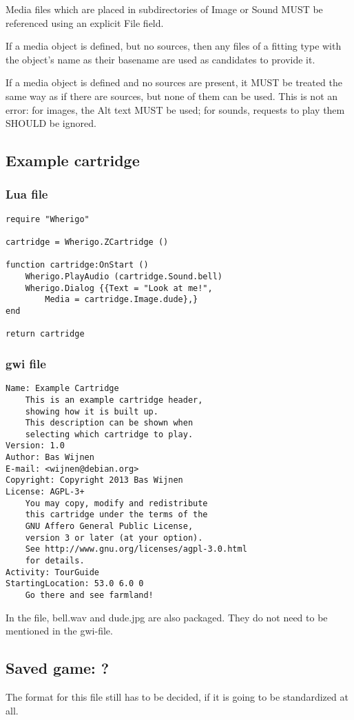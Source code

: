 \documentclass{article}
\begin{document}
Media files which are placed in subdirectories of Image or Sound MUST be
referenced using an explicit File field.

If a media object is defined, but no sources, then any files of a fitting type
with the object's name as their basename are used as candidates to provide it.

If a media object is defined and no sources are present, it MUST be treated the
same way as if there are sources, but none of them can be used. This is not an
error: for images, the Alt text MUST be used; for sounds, requests to play them
SHOULD be ignored.

\subsection{Example cartridge}
\subsubsection{Lua file}
\noindent\begin{lstlisting}
require "Wherigo"

cartridge = Wherigo.ZCartridge ()

function cartridge:OnStart ()
	Wherigo.PlayAudio (cartridge.Sound.bell)
	Wherigo.Dialog {{Text = "Look at me!",
		Media = cartridge.Image.dude},}
end

return cartridge
\end{lstlisting}
\subsubsection{gwi file}
\noindent\begin{lstlisting}
Name: Example Cartridge
	This is an example cartridge header,
	showing how it is built up.
	This description can be shown when
	selecting which cartridge to play.
Version: 1.0
Author: Bas Wijnen
E-mail: <wijnen@debian.org>
Copyright: Copyright 2013 Bas Wijnen
License: AGPL-3+
	You may copy, modify and redistribute
	this cartridge under the terms of the
	GNU Affero General Public License,
	version 3 or later (at your option).
	See http://www.gnu.org/licenses/agpl-3.0.html
	for details.
Activity: TourGuide
StartingLocation: 53.0 6.0 0
	Go there and see farmland!
\end{lstlisting}

In the file, bell.wav and dude.jpg are also packaged. They do not need to be
mentioned in the gwi-file.

\subsection{Saved game: ?}
The format for this file still has to be decided, if it is going to be
standardized at all.
\end{document}
